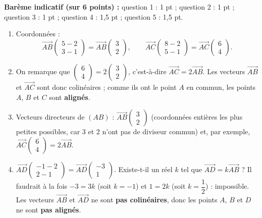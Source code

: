 \documentclass[11pt]{article}
\begin{document}
\begin{corrige}
\textbf{Barème indicatif (sur 6 points) :} question 1 : 1 pt ; question 2 : 1 pt ; question 3 : 1 pt ; question 4 : 1,5 pt ; question 5 : 1,5 pt.
\begin{enumerate}
\item Coordonnées :
\[ \overrightarrow{AB}\begin{pmatrix} 5-2 \\ 3-1 \end{pmatrix} = \overrightarrow{AB}\begin{pmatrix} 3 \\ 2 \end{pmatrix}, \qquad
\overrightarrow{AC}\begin{pmatrix} 8-2 \\ 5-1 \end{pmatrix} = \overrightarrow{AC}\begin{pmatrix} 6 \\ 4 \end{pmatrix}. \]
\item On remarque que $\begin{pmatrix} 6 \\ 4 \end{pmatrix} = 2\begin{pmatrix} 3 \\ 2 \end{pmatrix}$, c'est-à-dire $\overrightarrow{AC} = 2\overrightarrow{AB}$. Les vecteurs $\overrightarrow{AB}$ et $\overrightarrow{AC}$ sont donc colinéaires ; comme ils ont le point $A$ en commun, les points $A$, $B$ et $C$ sont \textbf{alignés}.
\item Vecteurs directeurs de $(AB)$ : $\overrightarrow{AB}\begin{pmatrix} 3 \\ 2 \end{pmatrix}$ (coordonnées entières les plus petites possibles, car $3$ et $2$ n'ont pas de diviseur commun) et, par exemple, $\overrightarrow{AC}\begin{pmatrix} 6 \\ 4 \end{pmatrix} = 2\overrightarrow{AB}$.
\item $\overrightarrow{AD}\begin{pmatrix} -1-2 \\ 2-1 \end{pmatrix} = \overrightarrow{AD}\begin{pmatrix} -3 \\ 1 \end{pmatrix}$. Existe-t-il un réel $k$ tel que $\overrightarrow{AD} = k\overrightarrow{AB}$ ? Il faudrait à la fois $-3 = 3k$ (soit $k = -1$) et $1 = 2k$ (soit $k = \dfrac{1}{2}$) : impossible. Les vecteurs $\overrightarrow{AB}$ et $\overrightarrow{AD}$ ne sont \textbf{pas colinéaires}, donc les points $A$, $B$ et $D$ ne sont \textbf{pas alignés}.

\end{enumerate}
\end{corrige}
\end{document}
